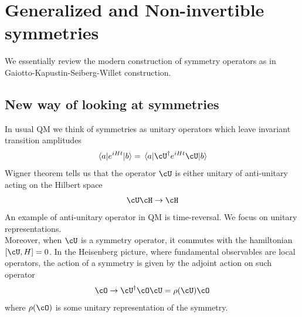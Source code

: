 \chapter{Generalized and Non-invertible symmetries}
We essentially review the modern construction of symmetry operators as in Gaiotto-Kapustin-Seiberg-Willet construction.
\section{New way of looking at symmetries}
In usual QM we think of symmetries as unitary operators which leave invariant transition amplitudes
\begin{equation}
	\mel{a}{e^{iHt}}{b}=\mel{a}{\cU^{\dagger}e^{iHt}\cU}{b}
\end{equation}
Wigner theorem tells us that the operator $\cU$ is either unitary of anti-unitary acting on the Hilbert space
\begin{equation}
	\cU\cH\rightarrow \cH
\end{equation}
An example of anti-unitary operator in QM is time-reversal. We focus on unitary representations.\\
Moreover, when $\cU$ is a symmetry operator, it commutes with the hamiltonian $\comm{\cU}{H}=0$. In the Heisenberg picture, where fundamental observables are local operators, the action of a symmetry is given by the adjoint action on such operator
\begin{equation}
	\cO\rightarrow \cU^{\dagger} \cO \cU=\rho(\cU)\cO
\end{equation}
where $\rho(\cO)$ is some unitary representation of the symmetry.

